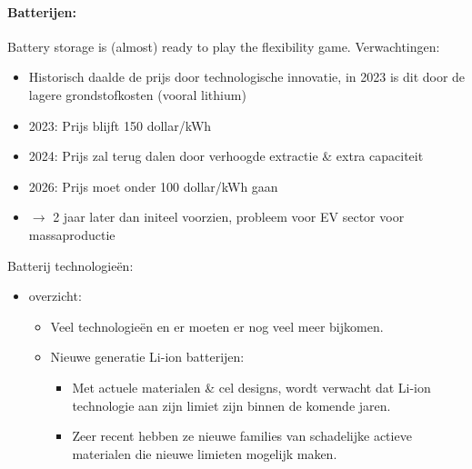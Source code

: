 \documentclass[12pt]{article}
\begin{document}
\paragraph{Batterijen:}
Battery storage is (almost) ready to play the flexibility game. Verwachtingen:\begin{itemize}
    \item[] Historisch daalde de prijs door technologische innovatie, in 2023 is dit door de lagere
    grondstofkosten (vooral lithium)
    \item 2023: Prijs blijft 150 dollar/kWh
    \item 2024: Prijs zal terug dalen door verhoogde extractie
    \& extra capaciteit
    \item 2026: Prijs moet onder 100 dollar/kWh gaan
    \item $\rightarrow$ 2 jaar later dan initeel voorzien, probleem
    voor EV sector voor massaproductie    
\end{itemize}
Batterij technologieën:\begin{itemize}
    \item overzicht:\begin{itemize}
        \item Veel technologieën en er moeten er nog veel meer bijkomen. 
        \item Nieuwe generatie Li-ion batterijen:\begin{itemize}
            \item Met actuele materialen \& cel designs, wordt verwacht dat Li-ion
            technologie aan zijn limiet zijn binnen de komende jaren. 
            \item Zeer recent hebben ze nieuwe families van schadelijke actieve
            materialen die nieuwe limieten mogelijk maken.
        \end{itemize}
    \end{itemize}
\end{itemize}
\end{document}
